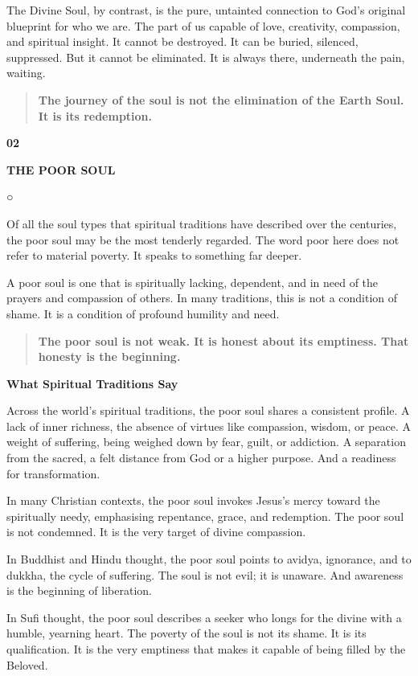 The Divine Soul, by contrast, is the pure, untainted connection to God's
original blueprint for who we are. The part of us capable of love,
creativity, compassion, and spiritual insight. It cannot be destroyed.
It can be buried, silenced, suppressed. But it cannot be eliminated. It
is always there, underneath the pain, waiting.

\begin{quote}
\textbf{The journey of the soul is not the elimination of the Earth
Soul. It is its redemption.}
\end{quote}

\textbf{02}

\textbf{THE POOR SOUL}

○

Of all the soul types that spiritual traditions have described over the
centuries, the poor soul may be the most tenderly regarded. The word
poor here does not refer to material poverty. It speaks to something far
deeper.

A poor soul is one that is spiritually lacking, dependent, and in need
of the prayers and compassion of others. In many traditions, this is not
a condition of shame. It is a condition of profound humility and need.

\begin{quote}
\textbf{The poor soul is not weak. It is honest about its emptiness.
That honesty is the beginning.}
\end{quote}

\textbf{What Spiritual Traditions Say}

Across the world's spiritual traditions, the poor soul shares a
consistent profile. A lack of inner richness, the absence of virtues
like compassion, wisdom, or peace. A weight of suffering, being weighed
down by fear, guilt, or addiction. A separation from the sacred, a felt
distance from God or a higher purpose. And a readiness for
transformation.

In many Christian contexts, the poor soul invokes Jesus's mercy toward
the spiritually needy, emphasising repentance, grace, and redemption.
The poor soul is not condemned. It is the very target of divine
compassion.

In Buddhist and Hindu thought, the poor soul points to avidya,
ignorance, and to dukkha, the cycle of suffering. The soul is not evil;
it is unaware. And awareness is the beginning of liberation.

In Sufi thought, the poor soul describes a seeker who longs for the
divine with a humble, yearning heart. The poverty of the soul is not its
shame. It is its qualification. It is the very emptiness that makes it
capable of being filled by the Beloved.

